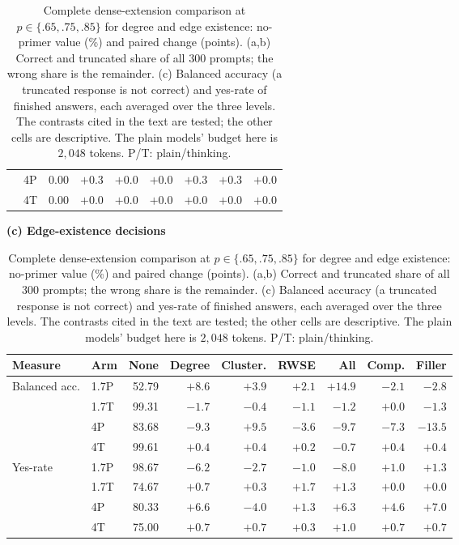 \begin{table}[t]
\begin{tabular}{llrrrrrrr}
 & 4P & 0.00 & $+0.3$ & $+0.0$ & $+0.0$ & $+0.3$ & $+0.3$ & $+0.0$\\ %
 & 4T & 0.00 & $+0.0$ & $+0.0$ & $+0.0$ & $+0.0$ & $+0.0$ & $+0.0$\\ %
\bottomrule
\end{tabular}
\par\medskip
\textbf{(c) Edge-existence decisions}\par\smallskip
\begin{tabular}{llrrrrrrr}
\toprule
Measure & Arm & None & Degree & Cluster. & RWSE & All & Comp. & Filler\\
\midrule
Balanced acc. & 1.7P & 52.79 & $+8.6$ & $+3.9$ & $+2.1$ & $+14.9$ & $-2.1$ & $-2.8$\\ %
 & 1.7T & 99.31 & $-1.7$ & $-0.4$ & $-1.1$ & $-1.2$ & $+0.0$ & $-1.3$\\ %
 & 4P & 83.68 & $-9.3$ & $+9.5$ & $-3.6$ & $-9.7$ & $-7.3$ & $-13.5$\\ %
 & 4T & 99.61 & $+0.4$ & $+0.4$ & $+0.2$ & $-0.7$ & $+0.4$ & $+0.4$\\ %
\addlinespace[3pt]
Yes-rate & 1.7P & 98.67 & $-6.2$ & $-2.7$ & $-1.0$ & $-8.0$ & $+1.0$ & $+1.3$\\ %
 & 1.7T & 74.67 & $+0.7$ & $+0.3$ & $+1.7$ & $+1.3$ & $+0.0$ & $+0.0$\\ %
 & 4P & 80.33 & $+6.6$ & $-4.0$ & $+1.3$ & $+6.3$ & $+4.6$ & $+7.0$\\ %
 & 4T & 75.00 & $+0.7$ & $+0.7$ & $+0.3$ & $+1.0$ & $+0.7$ & $+0.7$\\ %
\bottomrule
\end{tabular}
\caption{Complete dense-extension comparison at $p\in\{.65,.75,.85\}$ for degree and edge existence: no-primer value (\%) and paired change (points). (a,b) Correct and truncated share of all $300$ prompts; the wrong share is the remainder. (c) Balanced accuracy (a truncated response is not correct) and yes-rate of finished answers, each averaged over the three levels. The contrasts cited in the text are tested; the other cells are descriptive. The plain models' budget here is $2{,}048$ tokens. P/T: plain/thinking.} %
\label{tab:densematrix}
\end{table}
